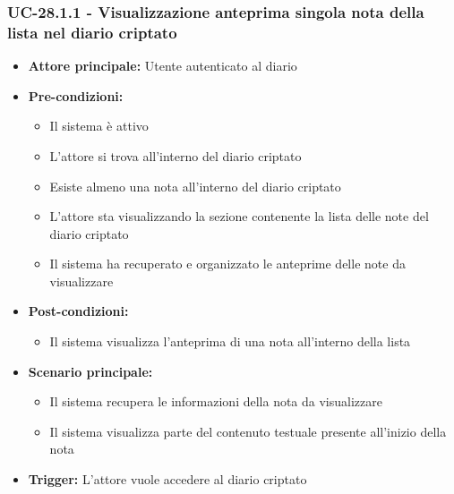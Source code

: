 \documentclass[a4paper,12pt]{article}
\begin{document}
\subsubsection{UC-28.1.1 - Visualizzazione anteprima singola nota della lista nel diario criptato} \label{subsec:UC-28.1.1}
\begin{itemize}
    \item \textbf{Attore principale:} Utente autenticato al diario
    \item \textbf{Pre-condizioni:}
    \begin{itemize}
        \item Il sistema è attivo
        \item L'attore si trova all'interno del diario criptato
        \item Esiste almeno una nota all'interno del diario criptato
        \item L'attore sta visualizzando la sezione contenente la lista delle note del diario criptato
        \item Il sistema ha recuperato e organizzato le anteprime delle note da visualizzare
    \end{itemize}
    \item \textbf{Post-condizioni:} 
    \begin{itemize}
        \item Il sistema visualizza l'anteprima di una nota all'interno della lista
    \end{itemize}
    \item \textbf{Scenario principale:} 
    \begin{itemize}
        \item Il sistema recupera le informazioni della nota da visualizzare
        \item Il sistema visualizza parte del contenuto testuale presente all'inizio della nota
    \end{itemize}
    \item \textbf{Trigger:} L'attore vuole accedere al diario criptato
\end{itemize}

\end{document}
